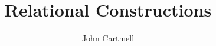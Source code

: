 \documentclass[10pt,a4paper]{article}
\title{Relational Constructions}
\author{John Cartmell}
\begin{document}
\maketitle
\newcommand{\compcent}[1]{\vcenter{\hbox{$#1\circ$}}} 

\newcommand{\comp}{\mathbin{\mathchoice 
{\compcent\scriptstyle}{\compcent\scriptstyle} 
{\compcent\scriptscriptstyle}{\compcent\scriptscriptstyle}}} 


\end{document}
